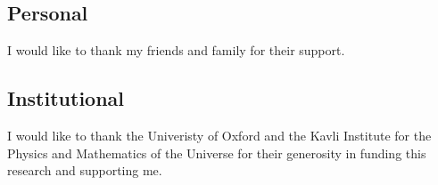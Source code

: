 \subsection*{Personal}
I would like to thank my friends and family for their support.

\subsection*{Institutional}
I would like to thank the Univeristy of Oxford and the Kavli Institute for the
Physics and Mathematics of the Universe for their generosity in funding this
research and supporting me.

